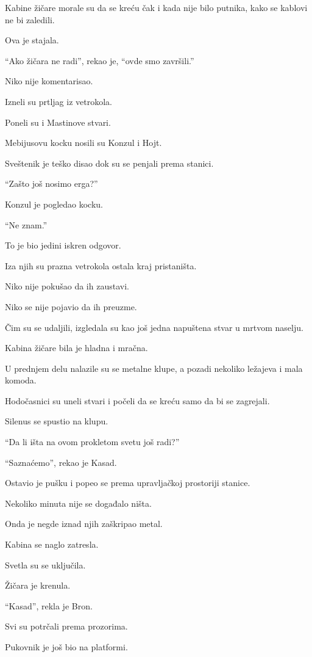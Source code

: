 Kabine žičare morale su da se kreću čak i kada nije bilo putnika, kako se kablovi ne bi zaledili.

Ova je stajala.

``Ako žičara ne radi'', rekao je, ``ovde smo završili.''

Niko nije komentarisao.

\bigskip

Izneli su prtljag iz vetrokola.

Poneli su i Mastinove stvari.

Mebijusovu kocku nosili su Konzul i Hojt.

Sveštenik je teško disao dok su se penjali prema stanici.

``Zašto još nosimo erga?''

Konzul je pogledao kocku.

``Ne znam.''

To je bio jedini iskren odgovor.

Iza njih su prazna vetrokola ostala kraj pristaništa.

Niko nije pokušao da ih zaustavi.

Niko se nije pojavio da ih preuzme.

Čim su se udaljili, izgledala su kao još jedna napuštena stvar u mrtvom naselju.

\bigskip

Kabina žičare bila je hladna i mračna.

U prednjem delu nalazile su se metalne klupe, a pozadi nekoliko ležajeva i mala komoda.

Hodočasnici su uneli stvari i počeli da se kreću samo da bi se zagrejali.

Silenus se spustio na klupu.

``Da li išta na ovom prokletom svetu još radi?''

``Saznaćemo'', rekao je Kasad.

Ostavio je pušku i popeo se prema upravljačkoj prostoriji stanice.

Nekoliko minuta nije se događalo ništa.

Onda je negde iznad njih zaškripao metal.

Kabina se naglo zatresla.

Svetla su se uključila.

Žičara je krenula.

``Kasad'', rekla je Bron.

Svi su potrčali prema prozorima.

Pukovnik je još bio na platformi.

